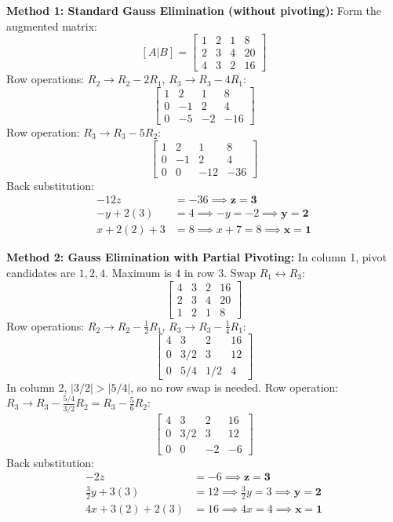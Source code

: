\documentclass[11pt,a4paper]{article}
\begin{document}
\begin{solbox}
\textbf{Method 1: Standard Gauss Elimination (without pivoting):}
Form the augmented matrix:
$$[A|B] = \left[\begin{array}{ccc|c}
1 & 2 & 1 & 8 \\
2 & 3 & 4 & 20 \\
4 & 3 & 2 & 16
\end{array}\right]$$
Row operations: $R_2 \to R_2 - 2R_1$, $R_3 \to R_3 - 4R_1$:
$$\left[\begin{array}{ccc|c}
1 & 2 & 1 & 8 \\
0 & -1 & 2 & 4 \\
0 & -5 & -2 & -16
\end{array}\right]$$
Row operation: $R_3 \to R_3 - 5R_2$:
$$\left[\begin{array}{ccc|c}
1 & 2 & 1 & 8 \\
0 & -1 & 2 & 4 \\
0 & 0 & -12 & -36
\end{array}\right]$$
Back substitution:
\begin{align*}
    -12z &= -36 \implies \mathbf{z = 3} \\
    -y + 2(3) &= 4 \implies -y = -2 \implies \mathbf{y = 2} \\
    x + 2(2) + 3 &= 8 \implies x + 7 = 8 \implies \mathbf{x = 1}
\end{align*}

\textbf{Method 2: Gauss Elimination with Partial Pivoting:}
In column 1, pivot candidates are $1, 2, 4$. Maximum is $4$ in row 3. Swap $R_1 \leftrightarrow R_3$:
$$\left[\begin{array}{ccc|c}
4 & 3 & 2 & 16 \\
2 & 3 & 4 & 20 \\
1 & 2 & 1 & 8
\end{array}\right]$$
Row operations: $R_2 \to R_2 - \frac{1}{2}R_1$, $R_3 \to R_3 - \frac{1}{4}R_1$:
$$\left[\begin{array}{ccc|c}
4 & 3 & 2 & 16 \\
0 & 3/2 & 3 & 12 \\
0 & 5/4 & 1/2 & 4
\end{array}\right]$$
In column 2, $|3/2| > |5/4|$, so no row swap is needed.
Row operation: $R_3 \to R_3 - \frac{5/4}{3/2}R_2 = R_3 - \frac{5}{6}R_2$:
$$\left[\begin{array}{ccc|c}
4 & 3 & 2 & 16 \\
0 & 3/2 & 3 & 12 \\
0 & 0 & -2 & -6
\end{array}\right]$$
Back substitution:
\begin{align*}
    -2z &= -6 \implies \mathbf{z = 3} \\
    \frac{3}{2}y + 3(3) &= 12 \implies \frac{3}{2}y = 3 \implies \mathbf{y = 2} \\
    4x + 3(2) + 2(3) &= 16 \implies 4x = 4 \implies \mathbf{x = 1}
\end{align*}


\end{solbox}
\end{document}
